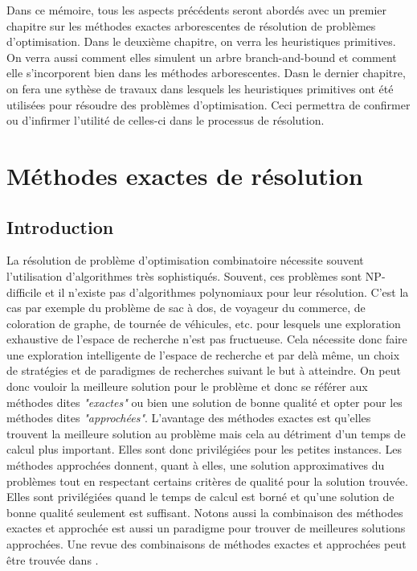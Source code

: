 \documentclass[12pt,a4paper,oneside]{book}
\theoremstyle{definition}
\begin{document}
    Dans ce mémoire, tous les aspects précédents seront abordés avec un premier chapitre sur les méthodes exactes arborescentes de résolution de problèmes d'optimisation. Dans le deuxième chapitre, on verra les heuristiques primitives. On verra aussi comment elles simulent un arbre branch-and-bound et comment elle s'incorporent bien dans les méthodes arborescentes. Dasn le dernier chapitre, on fera une sythèse de travaux dans lesquels les heuristiques primitives ont été utilisées pour résoudre des problèmes d'optimisation. Ceci permettra de confirmer ou d'infirmer l'utilité de celles-ci dans le processus de résolution. 

	\chapter{Méthodes exactes de résolution}
	\section{Introduction}
	La résolution de problème d'optimisation combinatoire nécessite souvent l'utilisation d'algorithmes très sophistiqués. Souvent, ces problèmes sont NP-difficile et il n'existe pas d'algorithmes polynomiaux pour leur résolution. C'est la cas par exemple du problème de sac à dos, de voyageur du commerce, de coloration de graphe, de tournée de véhicules, etc. pour lesquels une exploration exhaustive de l'espace de recherche n'est pas fructueuse. Cela nécessite donc faire une exploration intelligente de l'espace de recherche et par delà même, un choix de stratégies et de paradigmes de recherches suivant le but à atteindre. On peut donc vouloir la meilleure solution pour le problème et donc se référer aux méthodes dites \textit{"exactes"} ou bien une solution de bonne qualité et opter pour les méthodes dites \textit{"approchées"}. L'avantage des méthodes exactes est qu'elles trouvent la meilleure solution au problème mais cela au détriment d'un temps de calcul plus important. Elles sont donc privilégiées pour les petites instances. Les méthodes approchées donnent, quant à elles, une solution approximatives du problèmes tout en respectant certains critères de qualité pour la solution trouvée. Elles sont privilégiées quand le temps de calcul est borné et qu'une solution de bonne qualité seulement est suffisant. Notons aussi la combinaison des méthodes exactes et approchée est aussi un paradigme pour trouver de meilleures solutions approchées. Une revue des combinaisons de méthodes exactes et approchées peut être trouvée dans \cite{Puchinger2005}. 
\end{document}
